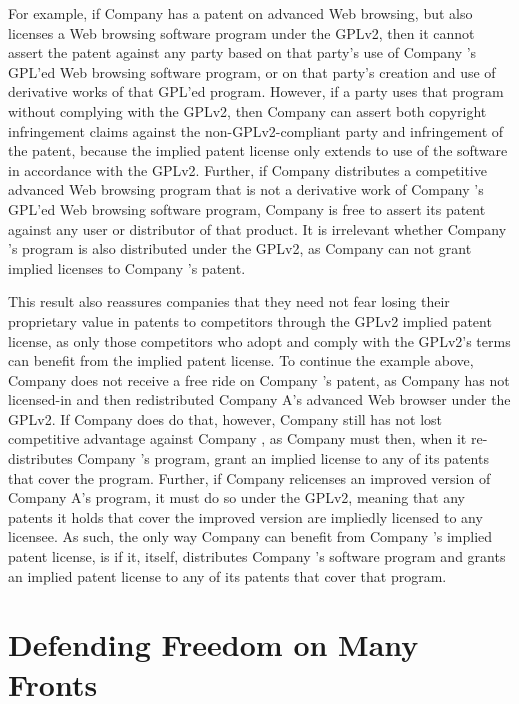 For example, if Company \compA{} has a patent on advanced Web browsing, but
also licenses a Web browsing software program under the GPLv2, then it
cannot assert the patent against any party based on that party's use of 
Company \compA{}'s GPL'ed Web browsing software program, or on that party's
creation and use of derivative works of that GPL'ed program.  However, if a
party uses that program without
complying with the GPLv2, then Company \compA{} can assert both copyright
infringement claims against the non-GPLv2-compliant party and
infringement of the patent, because the implied patent license only
extends to use of the software in accordance with the GPLv2. Further, if
Company \compB{} distributes a competitive advanced Web browsing program 
that is not a derivative work of Company \compA{}'s GPL'ed Web browsing software
program, Company \compA{} is free to assert its patent against any user or
distributor of that product. It is irrelevant whether Company \compB's
program is also distributed under the GPLv2, as Company \compB{} can not grant
implied licenses to Company \compA's patent.

This result also reassures companies that they need not fear losing their
proprietary value in patents to competitors through the GPLv2 implied patent
license, as only those competitors who adopt and comply with the GPLv2's
terms can benefit from the implied patent license. To continue the
example above, Company \compB{} does not receive a free ride on Company
\compA's patent, as Company \compB{} has not licensed-in and then
redistributed Company A's advanced Web browser under the GPLv2. If Company
\compB{} does do that, however, Company \compA{} still has not lost
competitive advantage against Company \compB{}, as Company \compB{} must then,
when it re-distributes Company \compA's program, grant an implied license
to any of its patents that cover the program. Further, if Company \compB{}
relicenses an improved version of Company A's program, it must do so under
the GPLv2, meaning that any patents it holds that cover the improved version
are impliedly licensed to any licensee. As such, the only way Company
\compB{} can benefit from Company \compA's implied patent license, is if it,
itself, distributes Company \compA's software program and grants an
implied patent license to any of its patents that cover that program.

\chapter{Defending Freedom on Many Fronts}


